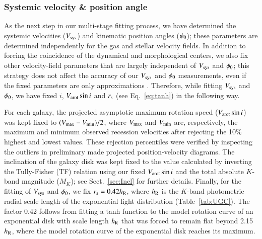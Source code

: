 \documentclass[traditabstract]{aa} %
\begin{document}
\subsubsection{Systemic velocity \& position angle}
\label{sec:PAVsys}

As the next step in our multi-stage fitting process, we have determined the
systemic velocities ($V_{\rm sys}$) and kinematic position angles ($\phi_0$); these parameters 
are determined independently for the gas and stellar velocity fields.  In addition to
forcing the coincidence of the dynamical and morphological centers, we also fix other
velocity-field parameters that are largely independent of $V_{\rm sys}$ and $\phi_0$; this 
strategy does not affect the accuracy of our $V_{\rm sys}$ and $\phi_0$ measurements, even if the
fixed parameters are only approximations \citep{begeman1989}.  Therefore, while fitting
$V_{\rm sys}$ and $\phi_0$, we have fixed $i$, $V_{\rm arot} \sin i$ and $r_{\rm s}$ (see Eq.~\ref{eq:tanh})
in the following way.

For each galaxy, the projected asymptotic maximum rotation speed ($V_{\rm arot} \sin
i$) was kept fixed to $(V_{\rm max} - V_{\rm min})/2$, where $V_{\rm max}$ and
$V_{\rm min}$ are, respectively, the maximum and minimum observed recession
velocities after rejecting the 10\% highest and lowest values.  These
rejection percentiles were verified by inspecting the outliers in preliminary
made projected position-velocity diagrams.  The inclination of the galaxy disk
was kept fixed to the value calculated by inverting the Tully-Fisher (TF)
relation \citep{tullyfisher1977} using our fixed $V_{\rm arot} \sin i$ and the total
absolute $K$-band magnitude ($M_K$); see Sect.~\ref{sec:Incl} for further
details.  Finally, for the fitting of $V_{\rm sys}$ and $\phi_0$, we fix $r_{\rm s} = 0.42h_{\rm R}$,
where $h_{\rm R}$ is the $K$-band photometric radial scale length of the
exponential light distribution (Table~\ref{tab:UGC}).
The factor 0.42 follows from fitting a tanh function to the model
rotation curve of an exponential disk with scale length $h_{\rm R}$ that was forced to remain
flat beyond 2.15$h_{\rm R}$, where the model rotation curve of the exponential disk reaches its
maximum. 
\end{document}
